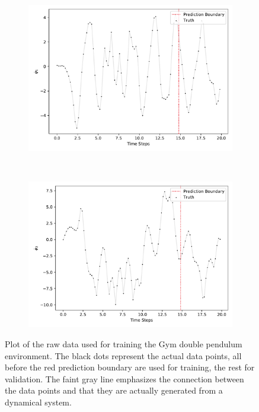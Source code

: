 \begin{figure}
\begin{subfigure}{0.5\linewidth}
					\includegraphics[width=\linewidth]{figures/experiments/environments/observations-acrobot-gym-N0-D4.pdf}
				\end{subfigure}%
				~
				\begin{subfigure}{0.5\linewidth}
					\centering
					\includegraphics[width=\linewidth]{figures/experiments/environments/observations-acrobot-gym-N0-D5.pdf}
				\end{subfigure}
				\caption{Plot of the raw data used for training the Gym double pendulum environment. The black dots represent the actual data points, all before the red prediction boundary are used for training, the rest for validation. The faint gray line emphasizes the connection between the data points and that they are actually generated from a dynamical system.}
				\label{fig:envDoublePendulumGym}
			\end{figure}

